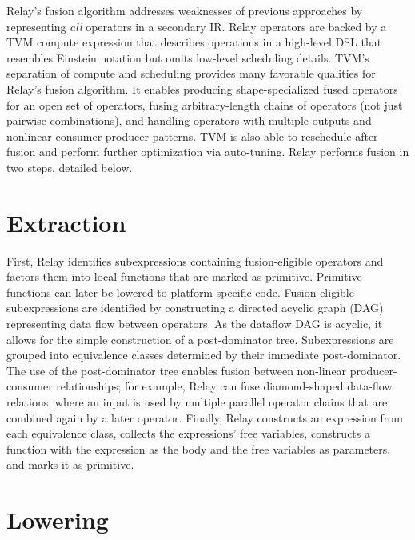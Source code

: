 Relay's fusion algorithm addresses weaknesses of previous approaches by representing
  \textit{all} operators in a secondary IR.
Relay operators are backed by a TVM compute expression that
  describes operations in a high-level DSL that resembles Einstein notation
  but omits low-level scheduling details.
TVM's separation of compute and scheduling provides many favorable qualities
  for Relay's fusion algorithm.
It enables producing shape-specialized fused operators for an open set of operators,
  fusing arbitrary-length chains of operators (not just pairwise combinations),
  and handling operators with multiple outputs and nonlinear consumer-producer patterns.
TVM is also able to reschedule after fusion and perform further optimization via auto-tuning.
Relay performs fusion in two steps, detailed below.

\section{Extraction}

First, Relay identifies subexpressions containing
  fusion-eligible operators and factors them into local functions that
  are marked as primitive.
Primitive functions can later be lowered to platform-specific
  code.
Fusion-eligible subexpressions are identified by constructing a
  directed acyclic graph (DAG) representing data flow between operators.
As the dataflow DAG is acyclic, it allows for the simple construction
  of a post-dominator tree.
Subexpressions are grouped into equivalence classes
  determined by their immediate post-dominator.
The use of the post-dominator tree enables fusion
  between non-linear producer-consumer relationships;
  for example, Relay can fuse diamond-shaped data-flow relations,
  where an input is used by multiple parallel operator chains
  that are combined again by a later operator.
Finally, Relay constructs an expression from each equivalence class,
  collects the expressions' free variables,
  constructs a function with the expression as the body and the free variables
  as parameters,
  and marks it as primitive.

\section{Lowering}

